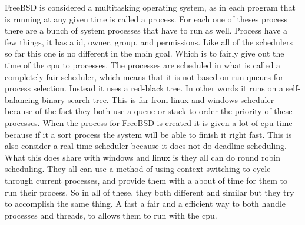 \documentclass[letterpaper,10pt,draftclsnofoot,onecolumn,titlepage]{IEEEtran}
\begin{document}
FreeBSD is considered a multitasking operating system, as in each program that is running at any given time is called a process. For each one of theses process there are a bunch of system processes that have to run as well. Process have a few things, it has a id, owner, group, and permissions. Like all of the schedulers so far this one is no different in the main goal. Which is to fairly give out the time of the cpu to processes. The processes are scheduled in what is called a completely fair scheduler, which means that it is not based on run queues for process selection. Instead it uses a red-black tree. In other words it runs on a self-balancing binary search tree. This is far from linux and windows scheduler because of the fact they both use a queue or stack to order the priority of these processes. When the process for FreeBSD is created it is given a lot of cpu time because if it a sort process the system will be able to finish it right fast. This is also consider a real-time scheduler because it does not do deadline scheduling. What this does share with windows and linux is they all can do round robin scheduling. They all can use a method of using context switching to cycle through current processes, and provide them with a about of time for them to run their process. So in all of these, they both different and similar but they try to accomplish the same thing. A fast a fair and a efficient way to both handle processes and threads, to allows them to run with the cpu.

	\nocite{*}
	
	
\end{document}
